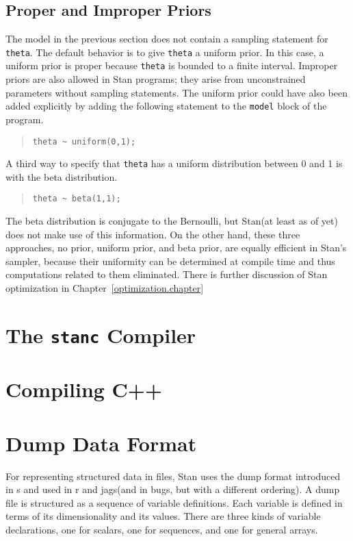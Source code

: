 \documentclass[10pt]{report}
\newcommand{\Stan}{Stan\xspace}
\newcommand{\acronym}[1]{{\sc #1}\xspace}
\newcommand{\R}{\acronym{r}}
\newcommand{\SPLUS}{\acronym{s}}
\newcommand{\BUGS}{\acronym{bugs}}
\newcommand{\JAGS}{\acronym{jags}}
\newcommand{\code}[1]{{\tt #1}}
\newcommand{\refchapter}[1]{Chapter~\ref{#1.chapter}}
\begin{document}
\section{Proper and Improper Priors}

The model in the previous section does not contain a sampling
statement for \code{theta}.  The default behavior is to give
\code{theta} a uniform prior.  In this case, a uniform prior is proper
because \code{theta} is bounded to a finite interval.  Improper priors
are also allowed in \Stan programs; they arise from unconstrained
parameters without sampling statements.  The uniform prior could have
also been added explicitly by adding the following statement to the
\code{model} block of the program.
%
\begin{quote}
\begin{Verbatim} 
theta ~ uniform(0,1);
\end{Verbatim}
\end{quote}
% 
A third way to specify that \code{theta} has a uniform distribution
between 0 and 1 is with the beta distribution.
%
\begin{quote}
\begin{Verbatim}
theta ~ beta(1,1);
\end{Verbatim}
\end{quote}
%
The beta distribution is conjugate to the Bernoulli, but \Stan (at
least as of yet) does not make use of this information.  On the other hand,
these three approaches, no prior, uniform prior, and beta prior,
are equally efficient in \Stan's sampler, because their uniformity
can be determined at compile time and thus computations related to
them eliminated.  There is further discussion of \Stan optimization
in \refchapter{optimization}

\chapter{The {\tt \bfseries stanc} Compiler}\label{stanc.chapter}

\chapter{Compiling C++}\label{compiling-cpp.chapter}


\chapter{Dump Data Format}\label{dump.chapter}

For representing structured data in files, \Stan uses the dump format
introduced in \SPLUS and used in \R and \JAGS (and in \BUGS, but with
a different ordering).   A dump file is structured as a sequence of
variable definitions.  Each variable is defined in terms of its
dimensionality and its values.   There are three kinds of variable
declarations, one for scalars, one for sequences, and one for general
arrays.
\end{document}
